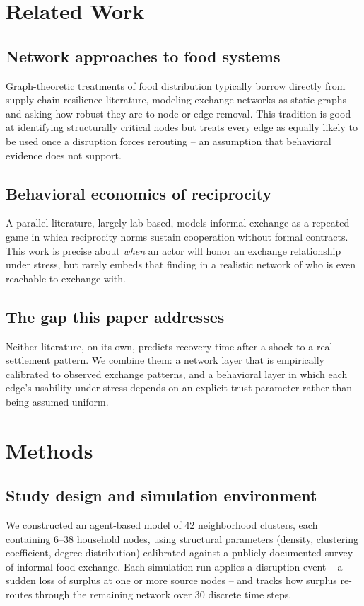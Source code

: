 \documentclass[10pt,twocolumn]{article}
\begin{document}
\section{Related Work}
\label{sec:related}

\subsection{Network approaches to food systems}
Graph-theoretic treatments of food distribution typically borrow directly
from supply-chain resilience literature, modeling exchange networks as
static graphs and asking how robust they are to node or edge removal.
This tradition is good at identifying structurally critical nodes but
treats every edge as equally likely to be used once a disruption forces
rerouting -- an assumption that behavioral evidence does not support.

\subsection{Behavioral economics of reciprocity}
A parallel literature, largely lab-based, models informal exchange as a
repeated game in which reciprocity norms sustain cooperation without
formal contracts. This work is precise about \emph{when} an actor will
honor an exchange relationship under stress, but rarely embeds that
finding in a realistic network of who is even reachable to exchange with.

\subsection{The gap this paper addresses}
Neither literature, on its own, predicts recovery time after a shock to a
real settlement pattern. We combine them: a network layer that is
empirically calibrated to observed exchange patterns, and a behavioral
layer in which each edge's usability under stress depends on an explicit
trust parameter rather than being assumed uniform.

\section{Methods}
\label{sec:methods}

\subsection{Study design and simulation environment}
We constructed an agent-based model of 42 neighborhood clusters, each
containing 6--38 household nodes, using structural parameters (density,
clustering coefficient, degree distribution) calibrated against a
publicly documented survey of informal food exchange. Each simulation run
applies a disruption event -- a sudden loss of surplus at one or more
source nodes -- and tracks how surplus re-routes through the remaining
network over 30 discrete time steps.
\end{document}

